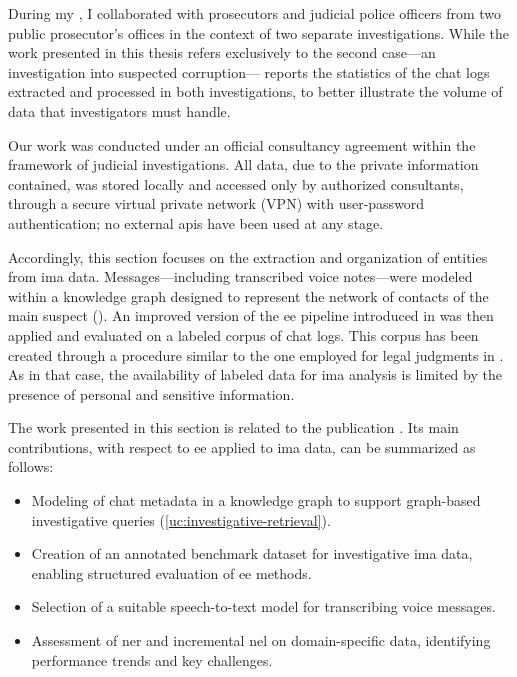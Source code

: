 During my \phd, I collaborated with prosecutors and judicial police officers from two public prosecutor's offices in the context of two separate investigations. While the work presented in this thesis refers exclusively to the second case---an investigation into suspected corruption--- reports the statistics of the chat logs extracted and processed in both investigations, to better illustrate the volume of data that investigators must handle.

Our work was conducted under an official consultancy agreement within the framework of judicial investigations. All data, due to the private information contained, was stored locally and accessed only by authorized consultants, through a secure virtual private network (VPN) with user-password authentication; no external \acp{api} have been used at any stage.


Accordingly, this section focuses on the extraction and organization of entities from \ac{ima} data. Messages---including transcribed voice notes---were modeled within a knowledge graph designed to represent the network of contacts of the main suspect (). An improved version of the \acf{ee} pipeline introduced in  was then applied and evaluated on a labeled corpus of chat logs. This corpus has been created through a procedure similar to the one employed for legal judgments in .
As in that case, the availability of labeled data for \ac{ima} analysis is limited by the presence of personal and sensitive information.


The work presented in this section is related to the \phd publication \textcite{pozzi_wise_2025}. Its main contributions, with respect to \acl{ee} applied to \acl{ima} data, can be summarized as follows:
\begin{itemize}
    \item Modeling of chat metadata in a knowledge graph to support graph-based investigative queries (\ref{uc:investigative-retrieval}).
    \item Creation of an annotated benchmark dataset for investigative \ac{ima} data, enabling structured evaluation of \ac{ee} methods.
    \item Selection of a suitable speech-to-text model for transcribing voice messages.
    \item Assessment of \acf{ner} and incremental \acf{nel} on domain-specific data, identifying performance trends and key challenges.
\end{itemize}

